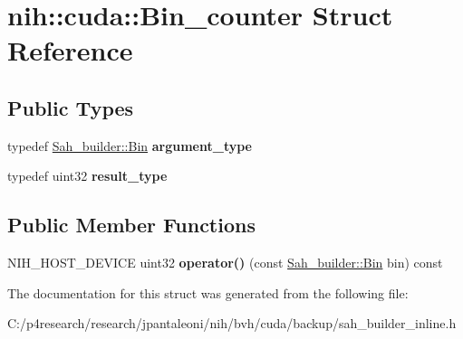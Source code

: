 \hypertarget{structnih_1_1cuda_1_1_bin__counter}{
\section{nih\-:\-:cuda\-:\-:\-Bin\-\_\-counter \-Struct \-Reference}
\label{structnih_1_1cuda_1_1_bin__counter}
}
\subsection*{\-Public \-Types}
\begin{DoxyCompactItemize}
\item 
\hypertarget{structnih_1_1cuda_1_1_bin__counter_af93c779bee8848ca24d327afb341026c}{
typedef \hyperlink{structnih_1_1cuda_1_1_sah__builder_1_1_bin}{\-Sah\-\_\-builder\-::\-Bin} {\bfseries argument\-\_\-type}}
\label{structnih_1_1cuda_1_1_bin__counter_af93c779bee8848ca24d327afb341026c}

\item 
\hypertarget{structnih_1_1cuda_1_1_bin__counter_a36a34503291d6bb3fecee3db69ec9223}{
typedef uint32 {\bfseries result\-\_\-type}}
\label{structnih_1_1cuda_1_1_bin__counter_a36a34503291d6bb3fecee3db69ec9223}

\end{DoxyCompactItemize}
\subsection*{\-Public \-Member \-Functions}
\begin{DoxyCompactItemize}
\item 
\hypertarget{structnih_1_1cuda_1_1_bin__counter_a824c859762adbf6e088912e22e162444}{
\-N\-I\-H\-\_\-\-H\-O\-S\-T\-\_\-\-D\-E\-V\-I\-C\-E uint32 {\bfseries operator()} (const \hyperlink{structnih_1_1cuda_1_1_sah__builder_1_1_bin}{\-Sah\-\_\-builder\-::\-Bin} bin) const }
\label{structnih_1_1cuda_1_1_bin__counter_a824c859762adbf6e088912e22e162444}

\end{DoxyCompactItemize}


\-The documentation for this struct was generated from the following file\-:\begin{DoxyCompactItemize}
\item 
\-C\-:/p4research/research/jpantaleoni/nih/bvh/cuda/backup/sah\-\_\-builder\-\_\-inline.\-h\end{DoxyCompactItemize}
